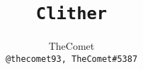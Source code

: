 \author{%
    TheComet\\
    \texttt{@thecomet93, TheComet\#5387}
}

\title{%
    \textbf{\Huge{\texttt{Clither}}} \\
}

